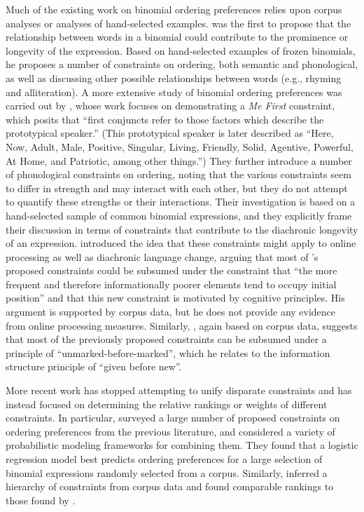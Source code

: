 \documentclass[authoryear]{elsarticle}
\begin{document}
	Much of the existing work on binomial ordering preferences relies upon corpus analyses or analyses of hand-selected examples. \citet{Malkiel:1959vs} was the first to propose that the relationship between words in a binomial could contribute to the prominence or longevity of the expression. Based on hand-selected examples of frozen binomials, he proposes a number of constraints on ordering, both semantic and phonological, as well as discussing other possible relationships between words (e.g., rhyming and alliteration). A more extensive study of binomial ordering preferences was carried out by \citet{Cooper:1975uz}, whose work focuses on demonstrating a \emph{Me First} constraint, which posits that ``first conjuncts refer to those factors which describe the prototypical speaker.'' (This prototypical speaker is later described as ``Here, Now, Adult, Male, Positive, Singular, Living, Friendly, Solid, Agentive, Powerful, At Home, and Patriotic, among other things.'') They further introduce a number of phonological constraints on ordering, noting that the various constraints seem to differ in strength and may interact with each other, but they do not attempt to quantify these strengths or their interactions. Their investigation is based on a hand-selected sample of common binomial expressions, and they explicitly frame their discussion in terms of constraints that contribute to the diachronic longevity of an expression. \citet{FenkOczlon:1989uq} introduced the idea that these constraints might apply to online processing as well as diachronic language change, arguing that most of \citeauthor{Cooper:1975uz}'s proposed constraints could be subsumed under the constraint that ``the more frequent and therefore informationally poorer elements tend to occupy initial position'' and that this new constraint is motivated by cognitive principles. His argument is supported by corpus data, but he does not provide any evidence from online processing measures. Similarly, \citet{Sobkowiak:1993ir}, again based on corpus data, suggests that most of the previously proposed constraints can be subsumed under a principle of ``unmarked-before-marked'', which he relates to the information structure principle of ``given before new''.
	
	More recent work has stopped attempting to unify disparate constraints and has instead focused on determining the relative rankings or weights of different constraints. In particular, \citet{Benor:2006gv} surveyed a large number of proposed constraints on ordering preferences from the previous literature, and considered a variety of probabilistic modeling frameworks for combining them. They found that a logistic regression model best predicts ordering preferences for a large selection of binomial expressions randomly selected from a corpus. Similarly, \citet{MOLLIN:2012ia} inferred a hierarchy of constraints from corpus data and found comparable rankings to those found by \citeauthor{Benor:2006gv}.
\end{document}

